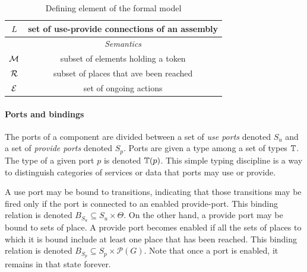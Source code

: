 \begin{table}[tp]
{\begin{tabular}{|c|c|}
      $L$ & set of use-provide connections of an assembly\\
      \hline
      \hline
      & \emph{Semantics}\\
      \hline
      $\mathcal{M}$ & subset of elements holding a token\\
      $\mathcal{R}$ & subset of places that ave been reached\\
      $\mathcal{E}$ & set of ongoing actions\\
      \hline
    \end{tabular}
  }
  \caption{Defining element of the \mad formal model}
  \label{tab:not}
\end{table}

\paragraph{Ports and bindings}{

The ports of a component are divided between a set of \emph{use ports}
denoted $S_{u}$ and a set of \emph{provide ports} denoted
$S_{p}$. Ports are given a type among a set of types $\mathbb{T}$. The
type of a given port $p$ is denoted $\mathbb{T}(p)$. This simple typing
discipline is a way to distinguish categories of services or data that
ports may use or provide.

A use port may be bound to transitions, indicating that those
transitions may be fired only if the port is connected to an enabled
provide-port. This binding relation is denoted $B_{S_{u}} \subseteq
S_u \times \Theta$. On the other hand, a provide port may be bound to
sets of place. A provide port becomes enabled if all the sets of
places to which it is bound include at least one place that has been
reached. This binding relation is denoted $B_{S_{p}} \subseteq S_p
\times \mathcal{P}(G)$. Note that once a port is enabled, it remains
in that state forever.



}
